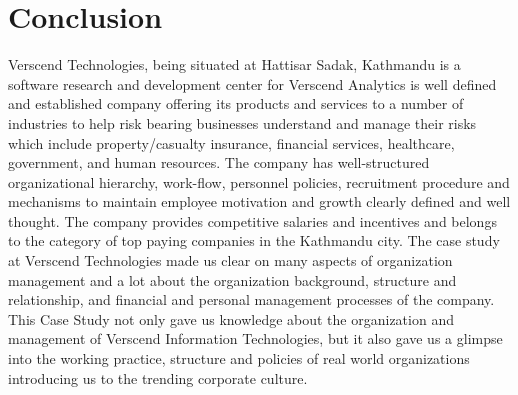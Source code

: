 \section{Conclusion}
Verscend Technologies, being situated at Hattisar Sadak, Kathmandu is a software research and development center for Verscend Analytics is well
defined and established company offering its products and services to a number of industries to help risk
bearing businesses understand and manage their risks which include property/casualty insurance, financial
services, healthcare, government, and human resources. The company has well-structured organizational
hierarchy, work-flow, personnel policies, recruitment procedure and mechanisms to maintain employee
motivation and growth clearly defined and well thought. The company provides competitive salaries and
incentives and belongs to the category of top paying companies in the Kathmandu city.
The case study at Verscend Technologies made us clear on many aspects of organization
management and a lot about the organization background, structure and relationship, and financial and
personal management processes of the company.
This Case Study not only gave us knowledge about the organization and management of Verscend Information
Technologies, but it also gave us a glimpse into the working practice, structure and policies of real world
organizations introducing us to the trending corporate culture.
\cleardoublepage
